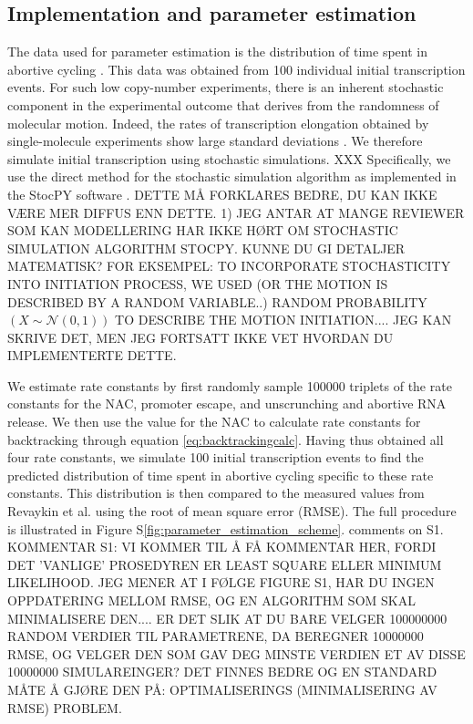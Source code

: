 \subsection{Implementation and parameter estimation}
The data used for parameter estimation is the distribution of time spent in
abortive cycling \cite{revyakin_abortive_2006}. This data was obtained from
100 individual initial transcription events. For such low copy-number
experiments, there is an inherent stochastic component in the experimental
outcome that derives from the randomness of molecular motion. Indeed, the
rates of transcription elongation obtained by single-molecule experiments show
large standard deviations \cite{adelman_single_2002,
tolic-norrelykke_diversity_2004}. We therefore simulate initial transcription
using stochastic simulations. XXX Specifically, we use the direct method for the
stochastic simulation algorithm \cite{gillespie_exact_1977} as implemented in
the StocPY software \cite{maarleveld_stochpy:_2013}. DETTE MÅ FORKLARES BEDRE,
DU KAN IKKE VÆRE MER DIFFUS ENN DETTE. 1) JEG ANTAR AT MANGE REVIEWER SOM KAN
MODELLERING HAR IKKE HØRT OM STOCHASTIC SIMULATION ALGORITHM STOCPY. KUNNE DU
GI DETALJER MATEMATISK? FOR EKSEMPEL: TO INCORPORATE STOCHASTICITY INTO
INITIATION PROCESS, WE USED (OR THE MOTION IS DESCRIBED BY A RANDOM
VARIABLE..) RANDOM PROBABILITY $(X \sim \mathcal{N} (0,1) )$ TO DESCRIBE THE
MOTION INITIATION.... JEG KAN SKRIVE DET, MEN JEG FORTSATT IKKE VET HVORDAN DU
IMPLEMENTERTE DETTE. 

We estimate rate constants by first randomly sample 100000 triplets of the
rate constants for the NAC, promoter escape, and unscrunching and abortive RNA
release. We then use the value for the NAC to calculate rate constants for
backtracking through equation \eqref{eq:backtrackingcalc}. Having thus obtained
all four rate constants, we simulate 100 initial transcription events to find the
predicted distribution of time spent in abortive cycling specific to these
rate constants. This distribution is then compared to the measured values from
Revaykin et al. \cite{revyakin_abortive_2006} using the root of mean square
error (RMSE). The full procedure is illustrated in Figure
S\ref{fig:parameter_estimation_scheme}. %
comments on S1.  KOMMENTAR S1: 
VI KOMMER TIL Å FÅ KOMMENTAR HER, FORDI DET 'VANLIGE' PROSEDYREN ER LEAST
SQUARE ELLER MINIMUM LIKELIHOOD. JEG MENER AT I FØLGE FIGURE S1, HAR DU INGEN
OPPDATERING MELLOM RMSE, OG EN ALGORITHM SOM SKAL MINIMALISERE DEN.... ER DET
SLIK AT DU BARE VELGER 100000000 RANDOM VERDIER TIL PARAMETRENE, DA BEREGNER
10000000 RMSE, OG VELGER DEN SOM GAV DEG MINSTE VERDIEN ET AV DISSE 10000000
SIMULAREINGER? DET FINNES BEDRE OG EN STANDARD MÅTE Å GJØRE DEN PÅ:
OPTIMALISERINGS (MINIMALISERING AV RMSE) PROBLEM.  

